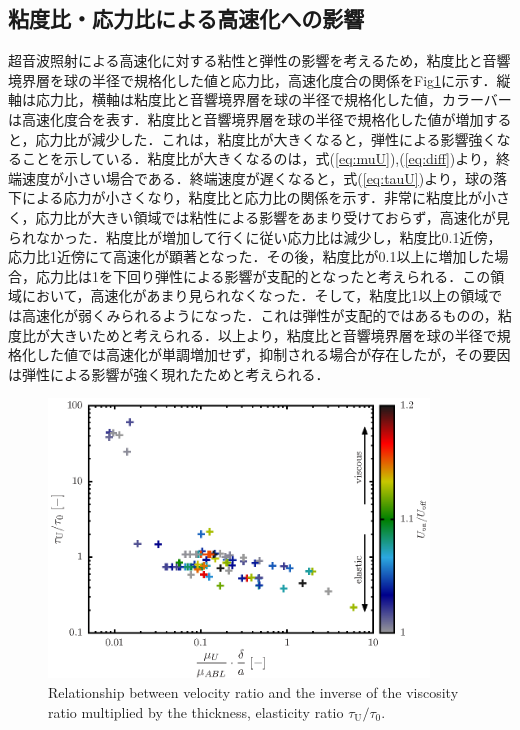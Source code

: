 \subsection{粘度比・応力比による高速化への影響}
超音波照射による高速化に対する粘性と弾性の影響を考えるため，粘度比と音響境界層を球の半径で規格化した値と応力比，高速化度合の関係をFig\ref{fig:elastcityColor}に示す．縦軸は応力比，横軸は粘度比と音響境界層を球の半径で規格化した値，カラーバーは高速化度合を表す．粘度比と音響境界層を球の半径で規格化した値が増加すると，応力比が減少した．これは，粘度比が大きくなると，弾性による影響強くなることを示している．粘度比が大きくなるのは，式(\ref{eq:muU}),(\ref{eq:diff})より，終端速度が小さい場合である．終端速度が遅くなると，式(\ref{eq:tauU})より，球の落下による応力が小さくなり，粘度比と応力比の関係を示す．非常に粘度比が小さく，応力比が大きい領域では粘性による影響をあまり受けておらず，高速化が見られなかった．粘度比が増加して行くに従い応力比は減少し，粘度比0.1近傍，応力比1近傍にて高速化が顕著となった．その後，粘度比が0.1以上に増加した場合，応力比は1を下回り弾性による影響が支配的となったと考えられる．この領域において，高速化があまり見られなくなった．そして，粘度比1以上の領域では高速化が弱くみられるようになった．これは弾性が支配的ではあるものの，粘度比が大きいためと考えられる．以上より，粘度比と音響境界層を球の半径で規格化した値では高速化が単調増加せず，抑制される場合が存在したが，その要因は弾性による影響が強く現れたためと考えられる．

\begin{figure}[H]
    \centering
    \includegraphics[width=0.9\textwidth]{5-Results/elastcity_color.eps}
    \caption{Relationship between velocity ratio and the inverse of the viscosity ratio multiplied by the thickness, elasticity ratio $\tau_\text{U}/\tau_\text{0}$.}
    \label{fig:elastcityColor}
\end{figure}
